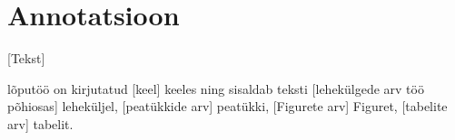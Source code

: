 \section*{\centering Annotatsioon}

[Tekst]

lõputöö on kirjutatud [keel] keeles ning sisaldab teksti [lehekülgede
arv töö põhiosas] leheküljel, [peatükkide arv] peatükki, [Figurete
arv] Figuret, [tabelite arv] tabelit.

\pagebreak
